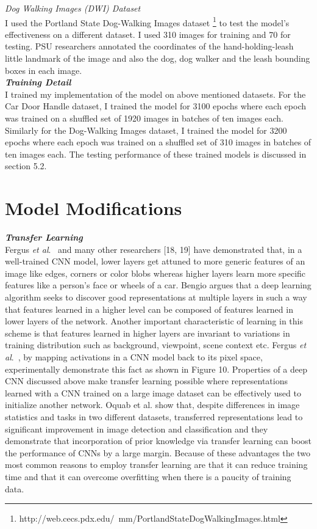 \documentclass [11pt,letterpaper ,twoside ,openany ]{report}
\begin{document}
    \noindent
    \textit{Dog Walking Images (DWI) Dataset}\\
    I used the Portland State Dog-Walking Images dataset \footnote {http://web.cecs.pdx.edu/~mm/PortlandStateDogWalkingImages.html} to test the model's effectiveness on a different dataset. I used 310 images for training and 70 for testing. PSU researchers annotated the coordinates of the hand-holding-leash little landmark of the image and also the dog, dog walker and the leash bounding boxes in each image.\\

    \noindent
    \textbf{\textit{Training Detail}}\\
    I trained my implementation of the model on above mentioned datasets. For the Car Door Handle dataset, I trained the model for 3100 epochs where each epoch was trained on a shuffled set of 1920 images in batches of ten images each. Similarly for the Dog-Walking Images dataset, I trained the model for 3200 epochs where each epoch was trained on a shuffled set of 310 images in batches of ten images each. The testing performance of these trained models is discussed in section 5.2.

    \section{Model Modifications}

    \noindent
    \textbf{\textit{Transfer Learning}}\\
    Fergus \textit {et al}.\ \cite{zeiler2014visualizing} and many other researchers [18, 19] have demonstrated that, in a well-trained CNN model, lower layers get attuned to more generic features of an image like edges, corners or color blobs whereas higher layers learn more specific features like a person's face or wheels of a car. Bengio \cite{bengio2012deep} argues that a deep learning algorithm seeks to discover good representations at multiple layers  in such a way that features learned in a higher level can be composed of features learned in lower layers of the network. Another important characteristic of learning in this scheme is that features learned in higher layers are invariant to variations in training distribution such as background, viewpoint, scene context etc. Fergus \textit{et al}.\ \cite{zeiler2014visualizing}, by mapping activations in a CNN model back to its pixel space, experimentally demonstrate this fact as shown in Figure 10. Properties of a deep CNN discussed above make transfer learning possible where representations learned with a CNN trained on a large image dataset can be effectively used to  initialize another network. Oquab et al. \cite{oquab2014learning} show that, despite differences in image statistics and tasks in two different datasets, transferred representations lead to significant improvement in image detection and classification and they demonstrate that incorporation of prior knowledge via transfer learning can boost the performance of CNNs by a large margin. Because of these advantages the two most common reasons to employ transfer learning are that it can reduce training time and that it can overcome overfitting when there is a paucity of training data.
\end{document}
